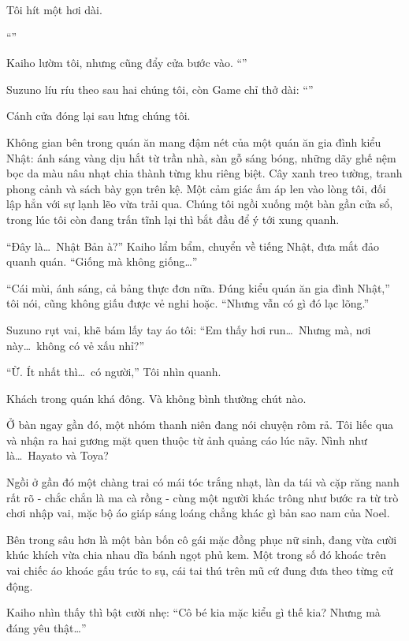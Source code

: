 \documentclass[../main.tex]{subfiles}
\begin{document}
Tôi hít một hơi dài.

``''

Kaiho lườm tôi, nhưng cũng đẩy cửa bước vào. ``''

Suzuno líu ríu theo sau hai chúng tôi, còn Game chỉ thở dài: ``''

Cánh cửa đóng lại sau lưng chúng tôi.

Không gian bên trong quán ăn mang đậm nét của một quán ăn gia đình kiểu Nhật: ánh sáng vàng dịu hắt từ trần nhà, sàn gỗ sáng bóng, những dãy ghế nệm bọc da màu nâu nhạt chia thành từng khu riêng biệt. Cây xanh treo tường, tranh phong cảnh và sách bày gọn trên kệ. Một cảm giác ấm áp len vào lòng tôi, đối lập hẳn với sự lạnh lẽo vừa trải qua. Chúng tôi ngồi xuống một bàn gần cửa sổ, trong lúc tôi còn đang trấn tĩnh lại thì bắt đầu để ý tới xung quanh.

``Đây là\dots\ Nhật Bản à?'' Kaiho lẩm bẩm, chuyển về tiếng Nhật, đưa mắt đảo quanh quán. ``Giống mà không giống\dots''

``Cái mùi, ánh sáng, cả bảng thực đơn nữa. Đúng kiểu quán ăn gia đình Nhật,'' tôi nói, cũng không giấu được vẻ nghi hoặc. ``Nhưng vẫn có gì đó lạc lõng.''

Suzuno rụt vai, khẽ bám lấy tay áo tôi: ``Em thấy hơi run\dots\ Nhưng mà, nơi này\dots\ không có vẻ xấu nhỉ?''

``Ừ. Ít nhất thì\dots\ có người,'' Tôi nhìn quanh.

Khách trong quán khá đông. Và không bình thường chút nào.

Ở bàn ngay gần đó, một nhóm thanh niên đang nói chuyện rôm rả. Tôi liếc qua và nhận ra hai gương mặt quen thuộc từ ảnh quảng cáo lúc nãy. Nình như là\dots\ Hayato và Toya?

Ngồi ở gần đó một chàng trai có mái tóc trắng nhạt, làn da tái và cặp răng nanh rất rõ - chắc chắn là ma cà rồng - cùng một người khác trông như bước ra từ trò chơi nhập vai, mặc bộ áo giáp sáng loáng chẳng khác gì bản sao nam của Noel.

Bên trong sâu hơn là một bàn bốn cô gái mặc đồng phục nữ sinh, đang vừa cười khúc khích vừa chia nhau dĩa bánh ngọt phủ kem. Một trong số đó khoác trên vai chiếc áo khoác gấu trúc to sụ, cái tai thú trên mũ cứ đung đưa theo từng cử động.

Kaiho nhìn thấy thì bật cười nhẹ: ``Cô bé kia mặc kiểu gì thế kia? Nhưng mà đáng yêu thật\dots''
\end{document}
